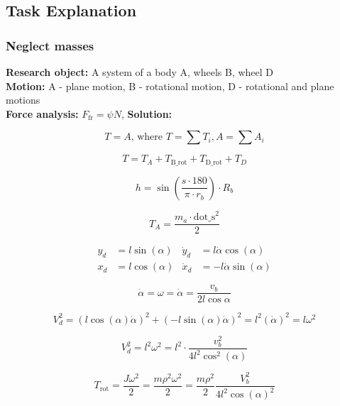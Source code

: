\documentclass{article}
\begin{document}
\subsection{Task Explanation}

\subsubsection{Neglect masses}

\textbf{Research object:} A system of a body A, wheels B, wheel D\\
\textbf{Motion:} A - plane motion, B - rotational motion, D - rotational and plane motions\\
\textbf{Force analysis:} $F_\text{fr} = \psi N$, 
\textbf{Solution:}

\[T = A \text{, where } T = \sum T_i, A = \sum A_i\]


\[
T = T_A + T_{\text{B\_rot}} + T_{\text{D\_rot}} + T_D
\]

\[
h = \sin\left(\frac{s \cdot 180}{\pi \cdot r_b}\right) \cdot R_b
\]

\[
T_A = \frac{m_a \cdot \text{dot\_s}^2}{2}
\]








\begin{align*}
    y_d &= l \sin(\alpha) & \dot{y}_d &= l \dot{\alpha} \cos(\alpha) \\
    x_d &= l \cos(\alpha) & \dot{x}_d &= -l \dot{\alpha} \sin(\alpha)
\end{align*}


\[ \dot \alpha = \omega = \dot \alpha = \dfrac{v_b}{2l \cos \alpha}\]

\[V_d^2 = (l \cos(\alpha) \dot{\alpha})^2 + (-l \sin(\alpha) \dot{\alpha})^2 = l^2 (\dot{\alpha})^2 = l \omega^2\]

\[V_d^2 = l^2 \omega^2 = l^2 \cdot \frac{v_b^2}{4l^2 \cos^2(\alpha)}\]

\[T_\text{rot} = \dfrac{J \omega^2}{2} = \dfrac{m \rho^2 \omega^2}{2} = \dfrac{m \rho^2}{2} \dfrac{V_b^2}{4l^2 \cos(\alpha)^2}\]
\end{document}
